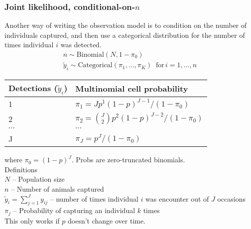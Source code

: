 \documentclass[color=usenames,dvipsnames]{beamer}\usepackage[]{graphicx}\usepackage[]{color}
\begin{document}
\begin{frame}
  \frametitle{Joint likelihood, conditional-on-$n$}
  \small
  Another way of writing the observation model is to condition on the
  number of individuals captured, and then use a
  categorical distribution for the number of times individual $i$
  was detected. 
  \begin{gather*}
    n \sim \mathrm{Binomial}\left(N, 1-\pi_0\right)                               \\
    \tilde{y}_i \sim \mathrm{Categorical}(\pi_1, \dots, \pi_K) \;\;
    \mathrm{for}\, i=1,\dots,n 
  \end{gather*}
  \pause
  \centering
  \vspace{6pt}
  \begin{tabular}{ll}
    \hline
    Detections ($\tilde{y}_i$) & Multinomial cell probability                     \\
    \hline
      1                        & $\pi_1 = Jp^{1}(1-p)^{J-1}/(1-\pi_0)$            \\
      2                        & $\pi_2 = {J\choose 2}p^{2}(1-p)^{J-2}/(1-\pi_0)$ \\
      $\cdots$                 & $\cdots$                                         \\
      J                        & $\pi_J = p^{J}/(1-\pi_0)$                        \\
      \hline
  \end{tabular}
  \flushleft
  \vspace{-6pt}
  where $\pi_0=(1-p)^J$. Probs are zero-truncated binomials. \\ 
  \pause
  \vfill
  Definitions \\
  \scriptsize
  $N$ -- Population size                                                          \\
  $n$ -- Number of animals captured                                               \\
  $\tilde{y}_i=\sum_{j=1}^J y_{ij}$ -- number of times individual $i$ was encounter out of $J$
  occasions                                                                       \\
  $\pi_j$ -- Probability of capturing an individual $k$ times \\
  \pause
  \vfill
  \centering
  This only works if $p$ doesn't change over time. \\
\end{frame}
\end{document}
